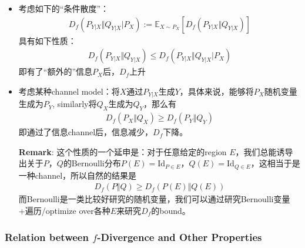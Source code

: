 \documentclass[11pt,a4paper]{ctexart}
\numberwithin{equation}{section}%
\begin{document}
\begin{itemize}[topsep=2pt,itemsep=0pt]
    \item 考虑如下的“条件散度”：
    \begin{align*}
        D_f\left(P_{Y|X}\Vert Q_{Y|X}\big| P_X\right) := \mathbb{E}_{X\sim P_X}\left[ D_f\left(P_{Y|X}\Vert Q_{Y|X}\right) \right] 
    \end{align*}
    具有如下性质：
    \begin{align*}
        D_f\left(P_{Y|X}\Vert Q_{Y|X}\right) \leq D_f\left(P_{Y|X}\Vert Q_{Y|X}\big| P_X\right) 
    \end{align*}
    即有了“额外的”信息$ P_X $后，$ D_f $上升
    \item 考虑某种channel model：将$ X $通过$ P_{Y|X} $生成$ Y $，具体来说，能够将$ P_X $随机变量生成为$ P_Y $, similarly将$Q_X$生成为$ Q_Y $，那么有
    \begin{align}\label{eq:info_channel}
         D_f(P_X\Vert Q_X) \geq D_f(P_Y\Vert Q_Y)
    \end{align}
    即通过了信息channel后，信息减少，$ D_f $下降。

    \textbf{Remark}: 这个性质的一个延申是：对于任意给定的region $ E $，我们总能诱导出关于$ P $，$ Q $的Bernoulli分布$ P(E) = \mathrm{Id}_{P\in E} $，$ Q(E) = \mathrm{Id}_{Q\in E} $，这相当于是一种channel，所以自然的结果是
    \begin{align*}
        D_f(P\Vert Q) \geq D_f(P(E)\Vert Q(E))
    \end{align*}
    而Bernoulli是一类比较好研究的随机变量，我们可以通过研究Bernoulli变量+遍历/optimize over各种$ E $来研究$ D_f $的bound。
\end{itemize}

    

\subsubsection{Relation between $ f $-Divergence and Other Properties}
\end{document}
